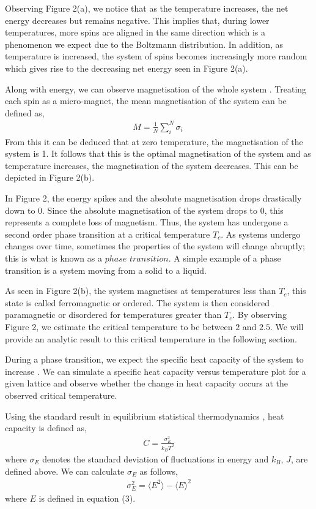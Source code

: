 \documentclass[a4paper]{article}
\begin{document}
Observing Figure 2(a), we notice that as the temperature increases, the net energy decreases but remains negative. This implies that, during lower temperatures, more spins are aligned in the same direction which is a phenomenon we expect due to the Boltzmann distribution. In addition, as temperature is increased, the system of spins becomes increasingly more random which gives rise to the decreasing net energy seen in Figure 2(a).

Along with energy, we can observe magnetisation of the whole system \cite{2}\cite{8}. Treating each spin as a micro-magnet, the mean magnetisation of the system can be defined as,
\begin{align*}
M = \frac{1}{N}\sum_{i}^{N} \sigma_{i} \
\end{align*}
From this it can be deduced that at zero temperature, the magnetisation of the system is 1. It follows that this is the optimal magnetisation of the system and as temperature increases, the magnetisation of the system decreases. This can be depicted in Figure 2(b).

In Figure 2, the energy spikes and the absolute magnetisation drops drastically down to 0. Since the absolute magnetisation of the system drops to 0, this represents a complete loss of magnetism. Thus, the system has undergone a second order phase transition at a critical temperature $T_{c}$. As systems undergo changes over time, sometimes the properties of the system will change abruptly; this is what is known as a $phase$ $transition$. A simple example of a phase transition is a system moving from a solid to a liquid.

As seen in Figure 2(b), the system magnetises at temperatures less than $T_{c}$, this state is called ferromagnetic or ordered. The system is then considered paramagnetic or disordered for temperatures greater than $T_{c}$. By observing Figure 2, we estimate the critical temperature to be between $2$ and $2.5$. We will provide an analytic result to this critical temperature in the following section.

During a phase transition, we expect the specific heat capacity of the system to increase \cite{8}. We can simulate a specific heat capacity versus temperature plot for a given lattice and observe whether the change in heat capacity occurs at the observed critical temperature.

Using the standard result in equilibrium statistical thermodynamics \cite{7}, heat capacity is defined as,
\begin{align*}
C = \frac{\sigma_{E}^2}{k_{B}T^2}
\end{align*}
where $\sigma_{E}$ denotes the standard deviation of fluctuations in energy and $k_{B}$, $J$, are defined above. We can calculate $\sigma_{E}$ as follows, 
\begin{align*}
\sigma_{E}^2 =  {\langle E^2\rangle} - {\langle E\rangle ^2}
\end{align*}
 where $E$ is defined in equation (3).
 
\end{document}
